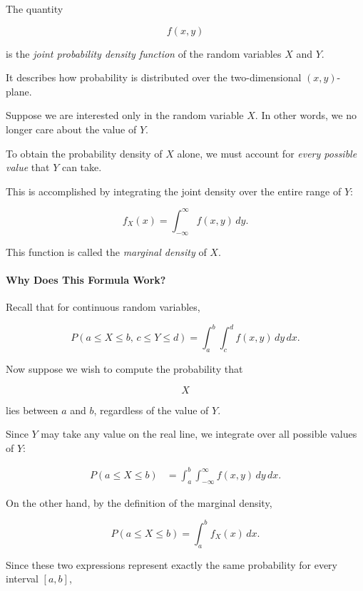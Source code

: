 \documentclass[11pt]{article}
\begin{document}
\begin{mdframed}[
		linewidth=0.8pt,
		roundcorner=6pt,
		backgroundcolor=gray!5,
		linecolor=gray!60,
		innertopmargin=10pt,
		innerbottommargin=10pt,
		innerleftmargin=10pt,
		innerrightmargin=10pt
		]
		The quantity
		
		\[
		f(x,y)
		\]
		
		is the \emph{joint probability density function} of the random variables
		\(X\) and \(Y\).
		
		It describes how probability is distributed over the two-dimensional
		\((x,y)\)-plane.
		
		Suppose we are interested only in the random variable \(X\). In other words,
		we no longer care about the value of \(Y\).
		
		To obtain the probability density of \(X\) alone, we must account for
		\emph{every possible value} that \(Y\) can take.
		
		This is accomplished by integrating the joint density over the entire range
		of \(Y\):
		
		\[
		\boxed{
			f_X(x)
			=
			\int_{-\infty}^{\infty}
			f(x,y)\,dy.
		}
		\]
		
		This function is called the \emph{marginal density} of \(X\).
		
		\bigskip
		
		\paragraph{Why Does This Formula Work?}
		
		Recall that for continuous random variables,
		
		\[
		P\!\left(
		a\le X\le b,\,
		c\le Y\le d
		\right)
		=
		\int_a^b
		\int_c^d
		f(x,y)
		\,dy\,dx.
		\]
		
		Now suppose we wish to compute the probability that
		
		\[
		X
		\]
		
		lies between \(a\) and \(b\), regardless of the value of \(Y\).
		
		Since \(Y\) may take any value on the real line, we integrate over all
		possible values of \(Y\):
		
		\[
		\begin{aligned}
			P(a\le X\le b)
			&=
			\int_a^b
			\int_{-\infty}^{\infty}
			f(x,y)
			\,dy\,dx.
		\end{aligned}
		\]
		
		On the other hand, by the definition of the marginal density,
		
		\[
		P(a\le X\le b)
		=
		\int_a^b
		f_X(x)\,dx.
		\]
		
		Since these two expressions represent exactly the same probability for every
		interval \([a,b]\),
		

\end{mdframed}
\end{document}

